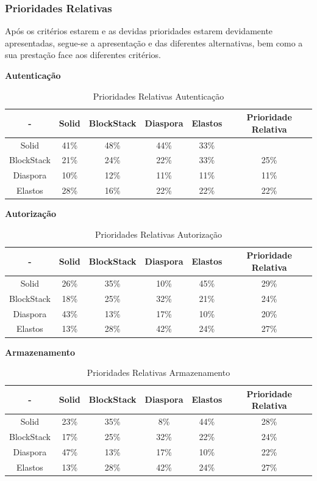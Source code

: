 \pagebreak

\subsubsection{Prioridades Relativas}
Após os critérios estarem e as devidas prioridades estarem devidamente apresentadas, segue-se a apresentação e das diferentes alternativas, bem como a sua prestação face aos diferentes critérios.

\textbf{Autenticação}

\begin{table}[h]
\centering
\caption{Prioridades Relativas Autenticação}
\vspace{0.5cm}
\begin{tabular}{c|c|c|c|c|c} 
 - & Solid & BlockStack & Diaspora & Elastos & Prioridade Relativa \\
\hline                               
Solid & 41\% &	48\% &	44\% & 33\% \\
BlockStack &  21\% & 24\% &	22\% &	33\% &	25\% \\
Diaspora &  10\% &	12\% &	11\% & 11\%	& 11\% \\
Elastos & 28\% & 16\% & 22\% & 22\% & 22\% \\
\end{tabular}
\end{table}

\textbf{Autorização}

\begin{table}[h]
\centering
\caption{Prioridades Relativas Autorização}
\vspace{0.5cm}
\begin{tabular}{c|c|c|c|c|c} 
 - & Solid & BlockStack & Diaspora & Elastos & Prioridade Relativa \\
\hline                               
Solid & 26\% &	35\% &	10\% & 45\% & 29\% \\
BlockStack &  18\% & 25\% & 32\% & 21\% & 24\% \\
Diaspora &  43\% &	13\% &	17\% &	10\% & 20\% \\
Elastos & 13\% & 28\% &	42\% & 24\% & 27\% \\
\end{tabular}
\end{table}

\pagebreak

\textbf{Armazenamento}

\begin{table}[h]
\centering
\caption{Prioridades Relativas Armazenamento}
\vspace{0.5cm}
\begin{tabular}{c|c|c|c|c|c} 
 - & Solid & BlockStack & Diaspora & Elastos & Prioridade Relativa \\
\hline                               
Solid & 23\% & 35\% & 8\% & 44\% & 28\% \\
BlockStack &  17\% & 25\%	& 32\%	& 22\%	& 24\% \\
Diaspora &  47\% &	13\% & 17\%	& 10\% & 22\% \\
Elastos & 13\% & 28\% & 42\% & 24\% & 27\% \\
\end{tabular}
\end{table}

